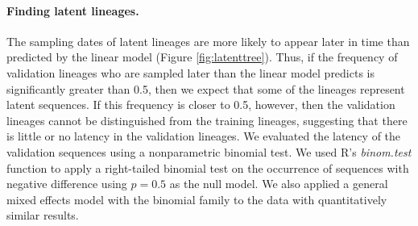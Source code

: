 \documentclass{bmcart}
\begin{document}
\paragraph {Finding latent lineages.} \label{subsec:experiments}

%
%
%


The sampling dates of latent lineages are more likely to appear later in time than predicted by the linear model (Figure \ref{fig:latenttree}).
Thus, if the frequency of validation lineages who are sampled later than the linear model predicts is significantly greater than 0.5, then we expect that some of the lineages represent latent sequences.
If this frequency is closer to 0.5, however, then the validation lineages cannot be distinguished from the training lineages, suggesting that there is little or no latency in the validation lineages.
We evaluated the latency of the validation sequences using a nonparametric binomial test.
We used R's {\it binom.test} function to apply a right-tailed binomial test on the occurrence of sequences with negative difference using $p=0.5$ as the null model.
We also applied a general mixed effects model with the binomial family to the data with quantitatively similar results.
\end{document}
